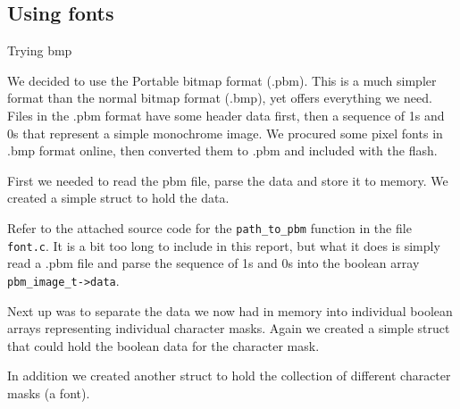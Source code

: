 \subsection{Using fonts}

Trying bmp

We decided to use the Portable bitmap format (.pbm).
This is a much simpler format than the normal bitmap format (.bmp),
yet offers everything we need.
Files in the .pbm format have some header data first, then a sequence of 1s and 0s that represent a simple monochrome image.
We procured some pixel fonts in .bmp format online, then converted them to .pbm and included with the flash.

First we needed to read the pbm file, parse the data and store it to memory.
We created a simple struct to hold the data.



Refer to the attached source code for the \texttt{path\_to\_pbm} function in the file \texttt{font.c}.
It is a bit too long to include in this report, but what it does is simply read a .pbm file and parse the sequence of 1s and 0s into the boolean array \texttt{pbm\_image\_t->data}.

Next up was to separate the data we now had in memory into individual boolean arrays representing individual character masks.
Again we created a simple struct that could hold the boolean data for the character mask.



In addition we created another struct to hold the collection of different character masks (a font).



